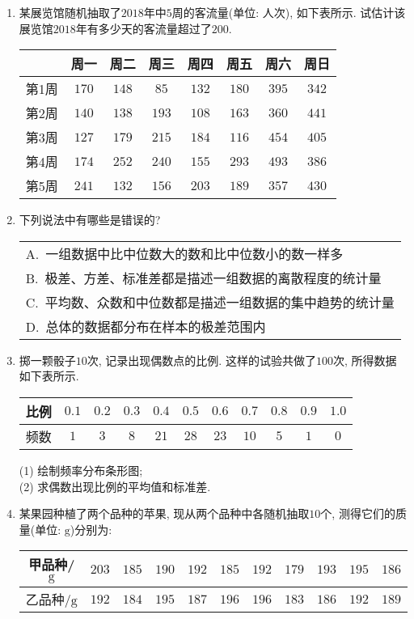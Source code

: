 \documentclass[10pt,a4paper]{article}
\newcommand{\onech}[4]{\par\begin{tabular}{p{.9\textwidth}}
A.~#1\\
B.~#2\\
C.~#3\\
D.~#4
\end{tabular}}
\begin{document}
\begin{enumerate}[1.]
\item 某展览馆随机抽取了$2018$年中$5$周的客流量(单位: 人次), 如下表所示. 试估计该展览馆$2018$年有多少天的客流量超过了$200$.
\begin{center}
\begin{tabular}{|c|c|c|c|c|c|c|c|}
\hline
 & 周一 & 周二 & 周三 & 周四 & 周五 & 周六 & 周日 \\ \hline
第1周 & $170$ & $148$ & $85$ & $132$ & $180$ & $395$ & $342$ \\ \hline
第2周 & $140$ & $138$ & $193$ & $108$ & $163$ & $360$ & $441$ \\ \hline
第3周 & $127$ & $179$ & $215$ & $184$ & $116$ & $454$ & $405$ \\ \hline
第4周 & $174$ & $252$ & $240$ & $155$ & $293$ & $493$ & $386$ \\ \hline
第5周 & $241$ & $132$ & $156$ & $203$ & $189$ & $357$ & $430$ \\ \hline    
\end{tabular}
\end{center}
\item 下列说法中有哪些是错误的?
\onech{一组数据中比中位数大的数和比中位数小的数一样多}{极差、方差、标准差都是描述一组数据的离散程度的统计量}{平均数、众数和中位数都是描述一组数据的集中趋势的统计量}{总体的数据都分布在样本的极差范围内}
\item 掷一颗骰子$10$次, 记录出现偶数点的比例. 这样的试验共做了$100$次, 所得数据如下表所示.
\begin{center}
\begin{tabular}{|c|c|c|c|c|c|c|c|c|c|c|}
\hline
比例 & $0.1$ & $0.2$ & $0.3$ & $0.4$ & $0.5$ & $0.6$ & $0.7$ & $0.8$ & $0.9$ & $1.0$ \\ \hline
频数 & $1$ & $3$ & $8$ & $21$ & $28$ & $23$ & $10$ & $5$ & $1$ & $0$ \\ \hline
\end{tabular}
\end{center}
(1) 绘制频率分布条形图;\\
(2) 求偶数出现比例的平均值和标准差.
\item 某果园种植了两个品种的苹果, 现从两个品种中各随机抽取$10$个, 测得它们的质量(单位: $\text{g}$)分别为:
\begin{center}
\begin{tabular}{|c|c|c|c|c|c|c|c|c|c|c|}
\hline
甲品种/$\text{g}$ & $203$ & $185$ & $190$ & $192$ & $185$ & $192$ & $179$ & $193$ & $195$ & $186$ \\ \hline
乙品种/$\text{g}$ & $192$ & $184$ & $195$ & $187$ & $196$ & $196$ & $183$ & $186$ & $192$ & $189$ \\ \hline

\end{tabular}
\end{center}
\end{enumerate}
\end{document}
